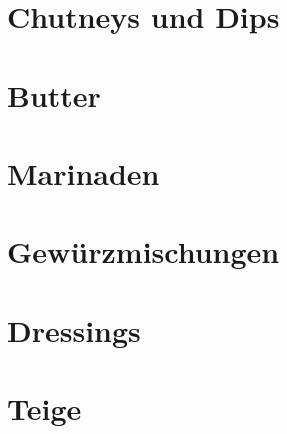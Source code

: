 \documentclass[DIV=11, pagesize, fontsize=11pt, paper=a4, numbers=noenddot]{scrartcl}
\begin{document}
\section{Chutneys und Dips}
\newpage{}
\newpage{}
\newpage{}
\newpage{}

\section{Butter}
\newpage{}
\newpage{}
\newpage{}
\newpage{}
\newpage{}

\section{Marinaden}
\newpage{}
\newpage{}
\newpage{}

\section{Gewürzmischungen}
\newpage{}

\section{Dressings}
\newpage{}

\section{Teige}
\newpage{}
\newpage{}
\end{document}
